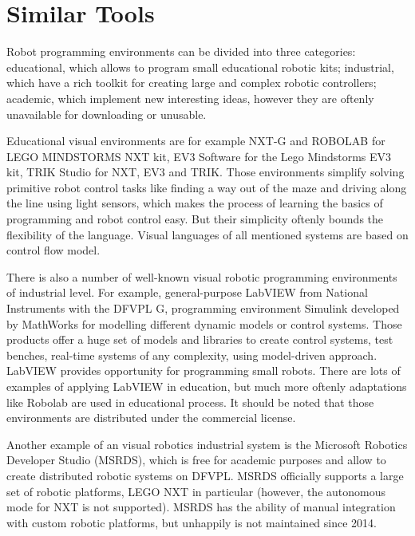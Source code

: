 \documentclass[conference,compsoc]{IEEEtran}
\begin{document}
\section{Similar Tools}
\label{sec:Overview}
Robot programming environments can be divided into three categories: educational, which allows to program small educational robotic kits; industrial, which have a rich toolkit for creating large and complex robotic controllers; academic, which implement new interesting ideas, however they are oftenly unavailable for downloading or unusable.

Educational visual environments are for example NXT-G and ROBOLAB for LEGO MINDSTORMS NXT kit, EV3 Software for the Lego Mindstorms EV3 kit, TRIK Studio for NXT, EV3 and TRIK. Those environments simplify solving primitive robot control tasks like finding a way out of the maze and driving along the line using light sensors, which makes the process of learning the basics of programming and robot control easy. But their simplicity oftenly bounds the flexibility of the language. Visual languages of all mentioned systems are based on control flow model.

There is also a number of well-known visual robotic programming environments of industrial level. For example, general-purpose LabVIEW from National Instruments with the DFVPL G, programming environment Simulink developed by MathWorks for modelling different dynamic models or control systems. Those products offer a huge set of models and libraries to create control systems, test benches, real-time systems of any complexity, using model-driven approach. LabVIEW provides opportunity for programming small robots. There are lots of examples of applying LabVIEW in education\cite{erwin2000lego, 1_gomez-de-gabriel_mandow_fernandez-lozano_garcia-cerezo_2011}, but much more oftenly adaptations like Robolab are used in educational process. It should be noted that those environments are distributed under the commercial license.

Another example of an visual robotics industrial system is the Microsoft Robotics Developer Studio (MSRDS)\cite{jackson2007microsoft}, which is free for academic purposes and allow to create distributed robotic systems on DFVPL. MSRDS officially supports a large set of robotic platforms, LEGO NXT\cite{kim2007programming} in particular (however, the autonomous mode for NXT is not supported). MSRDS has the ability of manual integration with custom robotic platforms, but unhappily is not maintained since 2014.
\end{document}
